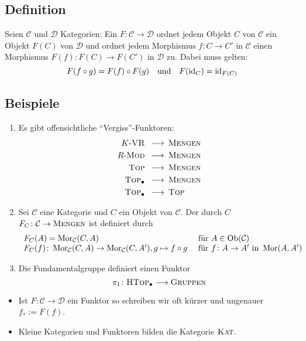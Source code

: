 \subsection[Definition: Funktor]{Definition} %
\label{sub:14}
Seien $\mathcal{C}$ und $\mathcal{D}$ Kategorien: Ein  $F \colon \mathcal{C} \to \mathcal{D}$ ordnet jedem Objekt $C$ von $\mathcal{C}$ ein Objekt $F(C)$ von 
$\mathcal{D}$ und ordnet jedem Morphismus $f : C \to C'$ in $\mathcal{C}$ einen Morphismus $F(f) \colon F(C) \to F(C')$ in $\mathcal{D}$ zu. Dabei muss gelten:
\[
	F(f \circ g) = F(f) \circ F(g) \quad \text{und} \quad F(\operatorname{id}_C) = \operatorname{id}_{F(C)}
\] 

\subsection[Beispiele für Funktoren]{Beispiele} %
\label{sub:15}
\begin{enumerate}[(1)]
	\item Es gibt offensichtliche \enquote{Vergiss}-Funktoren:
	\begin{align*}
		K\text{-}\textsc{VR} \enspace\longrightarrow & \enspace\textsc{Mengen} \\
		R\text{-}\textsc{Mod} \enspace\longrightarrow & \enspace\textsc{Mengen} \\
		\textsc{Top} \enspace\longrightarrow & \enspace\textsc{Mengen} \\
		\textsc{Top}_\bullet \enspace\longrightarrow & \enspace\textsc{Mengen} \\
		\textsc{Top}_\bullet \enspace\longrightarrow & \enspace \textsc{Top}
	\end{align*}
	\item Sei $\mathcal{C}$ eine Kategorie und $C$ ein Objekt von $\mathcal{C}$. Der durch $C$  
	$F_C \colon \mathcal{C} \to \textsc{Mengen}$ ist definiert durch 
	\[
		\begin{array}{ll}
			F_C(A) = \operatorname{Mor}_\mathcal{C}(C,A) &\text{ für } A \in  \operatorname{Ob}(\mathcal{C}) \\
			F_C(f) \colon \operatorname{Mor}_\mathcal{C}(C,A) \to \operatorname{Mor}_\mathcal{C}(C,A'), g \mapsto f \circ  g &\text{ für } f \colon A \to A' \text{ in } \operatorname{Mor}(A,A')
		\end{array}
	\]
	\item Die Fundamentalgruppe definiert einen Funktor
	\[
		\pi_1 \colon \textsc{HTop}_\bullet \longrightarrow \textsc{Gruppen}
	\]
\end{enumerate}
\begin{itemize}
	\item Ist $F \colon \mathcal{C} \to \mathcal{D}$ ein Funktor so schreiben wir oft kürzer und ungenauer $f_* := F(f)$.
	\item Kleine Kategorien und Funktoren bilden die Kategorie $\textsc{Kat}$.
\end{itemize}

